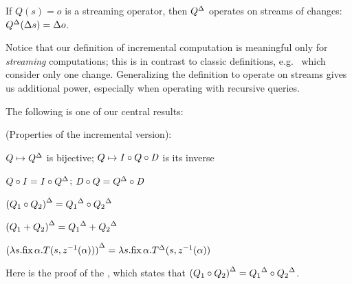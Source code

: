 \begin{center}
\end{center}
If $Q(s) = o$ is a streaming operator, then ${Q}^{\Delta}$ operates on
streams of changes: ${Q}^{\Delta}(\Delta s) = \Delta o$.

Notice that our definition of incremental computation is meaningful only for \emph{streaming}
computations; this is in contrast to classic definitions, e.g.~\cite{gupta-idb95} which
consider only one change.  Generalizing the definition to operate on streams gives us
additional power, especially when operating with recursive queries.

The following is one of our central results:

\begin{proposition}(Properties of the incremental version):
\label{prop-inc-properties}
\begin{description}[nosep, leftmargin=\parindent]
\item[inversion:] $Q\mapsto{Q}^{\Delta}$ is bijective; $Q\mapsto \mathit{I}\circ
  Q\circ\mathit{D}$ is its inverse
\item[push/pull:] \label{prop-part-commutation}
    $Q \circ \mathit{I} = \mathit{I} \circ {Q}^{\Delta}$; $\mathit{D}\circ Q = {Q}^{\Delta}\circ\mathit{D}$
\item[chain:] ${(Q_1\circ Q_2)}^{\Delta} = {Q_1}^{\Delta}\circ{Q_2}^{\Delta}$
\item[add:] ${(Q_1 + Q_2)}^{\Delta} = {Q_1}^{\Delta} + {Q_2}^{\Delta}$
\item[cycle:] ${(\lambda s. \mbox{fix}\,\alpha.T(s,z^{-1}(\alpha)))}^{\Delta} = \lambda s. \mbox{fix}\,\alpha.{T}^{\Delta}(s,z^{-1}(\alpha))$
\end{description}
\end{proposition}

Here is the proof of the , which states that
${(Q_1 \circ Q_2)}^{\Delta} = {Q_1}^{\Delta} \circ {Q_2}^{\Delta}$.

